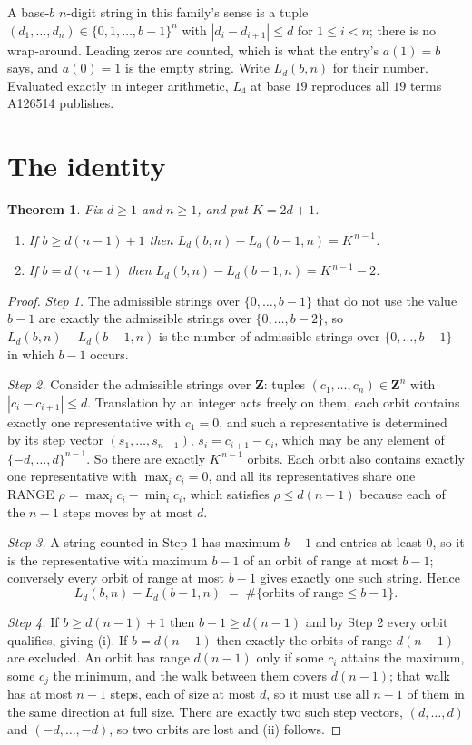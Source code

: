 \documentclass[11pt,a4paper]{article}
\theoremstyle{plain}
\newtheorem{theorem}{Theorem}
\theoremstyle{definition}
\begin{document}
A base-$b$ $n$-digit string in this family's sense is a tuple
$(d_1,\dots,d_n)\in\{0,1,\dots,b-1\}^{n}$ with $|d_i-d_{i+1}|\le d$ for $1\le i<n$; there
is no wrap-around. Leading zeros are counted, which is what the entry's $a(1)=b$ says, and
$a(0)=1$ is the empty string. Write $L_d(b,n)$ for their number. Evaluated exactly in integer
arithmetic, $L_{4}$ at base $19$ reproduces all $19$ terms A126514 publishes.

\section{The identity}

\begin{theorem}
Fix $d\ge1$ and $n\ge1$, and put $K=2d+1$.
\begin{enumerate}
\item[(i)] If $b\ge d(n-1)+1$ then $L_d(b,n)-L_d(b-1,n)=K^{\,n-1}$.
\item[(ii)] If $b=d(n-1)$ then $L_d(b,n)-L_d(b-1,n)=K^{\,n-1}-2$.
\end{enumerate}
\end{theorem}

\begin{proof}
\emph{Step 1.} The admissible strings over $\{0,\dots,b-1\}$ that do not use the value $b-1$
are exactly the admissible strings over $\{0,\dots,b-2\}$, so $L_d(b,n)-L_d(b-1,n)$ is the
number of admissible strings over $\{0,\dots,b-1\}$ in which $b-1$ occurs.

\emph{Step 2.} Consider the admissible strings over $\mathbf{Z}$: tuples
$(c_1,\dots,c_n)\in\mathbf{Z}^{n}$ with $|c_i-c_{i+1}|\le d$. Translation by an integer acts
freely on them, each orbit contains exactly one representative with $c_1=0$, and such a
representative is determined by its step vector $(s_1,\dots,s_{n-1})$, $s_i=c_{i+1}-c_i$,
which may be any element of $\{-d,\dots,d\}^{n-1}$. So there are exactly $K^{\,n-1}$ orbits.
Each orbit also contains exactly one representative with $\max_i c_i=0$, and all its
representatives share one RANGE $\rho=\max_ic_i-\min_ic_i$, which satisfies
$\rho\le d(n-1)$ because each of the $n-1$ steps moves by at most $d$.

\emph{Step 3.} A string counted in Step 1 has maximum $b-1$ and entries at least $0$, so it is
the representative with maximum $b-1$ of an orbit of range at most $b-1$; conversely every orbit
of range at most $b-1$ gives exactly one such string. Hence
\[
L_d(b,n)-L_d(b-1,n)\;=\;\#\{\text{orbits of range}\le b-1\} .
\]

\emph{Step 4.} If $b\ge d(n-1)+1$ then $b-1\ge d(n-1)$ and by Step 2 every orbit qualifies,
giving (i). If $b=d(n-1)$ then exactly the orbits of range $d(n-1)$ are excluded. An orbit has
range $d(n-1)$ only if some $c_i$ attains the maximum, some $c_j$ the minimum, and the walk
between them covers $d(n-1)$; that walk has at most $n-1$ steps, each of size at most $d$, so it
must use all $n-1$ of them in the same direction at full size. There are exactly two such step
vectors, $(d,\dots,d)$ and $(-d,\dots,-d)$, so two orbits are lost and (ii) follows.
\end{proof}
\end{document}
